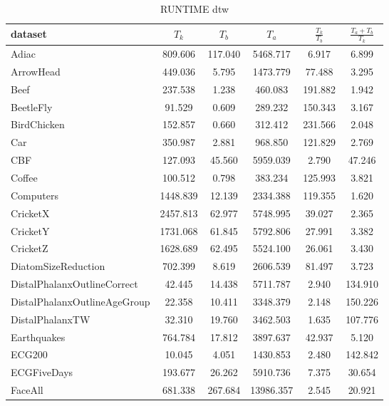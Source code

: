     
    \begin{table}[ht]
        \caption{RUNTIME dtw} 
        \begin{adjustbox}{width=0.7\textwidth,center}
        \begin{tabular}{lccccc}
        \hline
        dataset & $T_k$ & $T_b$ & $T_a$ & $\frac{T_k}{T_b}$ & $\frac{T_a + T_b}{T_k}$ \\ \hline
        Adiac & 809.606 & 117.040 & 5468.717 & 6.917 & 6.899 \\
        ArrowHead & 449.036 & 5.795 & 1473.779 & 77.488 & 3.295 \\
        Beef & 237.538 & 1.238 & 460.083 & 191.882 & 1.942 \\
        BeetleFly & 91.529 & 0.609 & 289.232 & 150.343 & 3.167 \\
        BirdChicken & 152.857 & 0.660 & 312.412 & 231.566 & 2.048 \\
        Car & 350.987 & 2.881 & 968.850 & 121.829 & 2.769 \\
        CBF & 127.093 & 45.560 & 5959.039 & 2.790 & 47.246 \\
        Coffee & 100.512 & 0.798 & 383.234 & 125.993 & 3.821 \\
        Computers & 1448.839 & 12.139 & 2334.388 & 119.355 & 1.620 \\
        CricketX & 2457.813 & 62.977 & 5748.995 & 39.027 & 2.365 \\
        CricketY & 1731.068 & 61.845 & 5792.806 & 27.991 & 3.382 \\
        CricketZ & 1628.689 & 62.495 & 5524.100 & 26.061 & 3.430 \\
        DiatomSizeReduction & 702.399 & 8.619 & 2606.539 & 81.497 & 3.723 \\
        DistalPhalanxOutlineCorrect & 42.445 & 14.438 & 5711.787 & 2.940 & 134.910 \\
        DistalPhalanxOutlineAgeGroup & 22.358 & 10.411 & 3348.379 & 2.148 & 150.226 \\
        DistalPhalanxTW & 32.310 & 19.760 & 3462.503 & 1.635 & 107.776 \\
        Earthquakes & 764.784 & 17.812 & 3897.637 & 42.937 & 5.120 \\
        ECG200 & 10.045 & 4.051 & 1430.853 & 2.480 & 142.842 \\
        ECGFiveDays & 193.677 & 26.262 & 5910.736 & 7.375 & 30.654 \\
        FaceAll & 681.338 & 267.684 & 13986.357 & 2.545 & 20.921 \\

\end{tabular}
\end{adjustbox}
\end{table}
